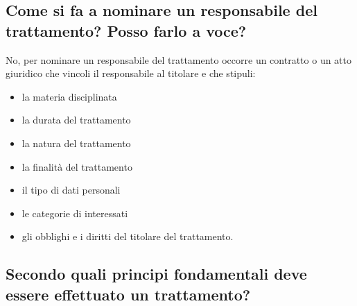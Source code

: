 \subsection{Come si fa a nominare un responsabile del trattamento? Posso farlo a voce?}
No, per nominare un responsabile del trattamento occorre un contratto o un atto giuridico che vincoli il responsabile al titolare e che stipuli:
\begin{itemize}
    \item la materia disciplinata
    \item la durata del trattamento
    \item la natura del trattamento
    \item la finalità del trattamento
    \item il tipo di dati personali
    \item le categorie di interessati
    \item gli obblighi e i diritti del titolare del trattamento.
\end{itemize}

\subsection{Secondo quali principi fondamentali deve essere effettuato un trattamento?}

